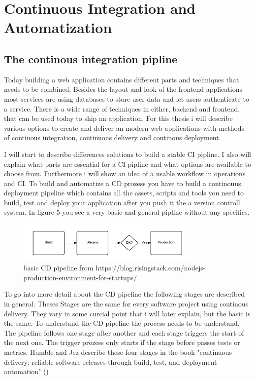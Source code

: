 \newpage

\section{Continuous Integration and Automatization}
\label{section:The Foundations of Continuous Integration and Automatization in Development Operations}

\subsection{The continous integration pipline}
Today building a web application contains different parts and techniques that needs to be combined. Besides the layout and look of the frontend applications
most services are using databases to store user data and let users authenticate to a service. There is a wide range of techniques in either, backend and
frontend, that can be used today to ship an application. For this thesis i will describe various options to create and deliver an modern web
applications with methods of continous integration, continuous delivery and continous deployment.

I will start to describe differences solutions to build a stable CI pipline. I also will explain what parts are essential for a CI pipline and what options
are available to choose from. Furthermore i will show an idea of a usable workflow in operations and CI. To build and automatize a CD prozess you have to build
a continouus deployment pipeline which contains all the assets, scripts and tools you need to build, test and deploy your application after you push it the a
version controll system. In figure 5 you see a very basic and general pipline without any specifics.


\begin{figure}[h!]
  \centering
  \includegraphics[width=0.8\textwidth]{images/pipeline.png}
  \caption{basic CD pipeline from https://blog.risingstack.com/nodejs-production-environment-for-startups/}
\end{figure}

To go into more detail about the CD pipeline the following stages are described in general. Theses Stages are the same for every software project using
continous delivery. They vary in some curcial point that i will later explain, but the basic is the same. To understand the CD pipeline the process needs
to be understand. The pipeline follows one stage after another and each stage triggers the start of the next one. The trigger prozess only starts if the
stage before passes tests or metrics. Humble and Jez describe these four stages in the book "continuous delivery: reliable software releases through build,
test, and deployment automation" (\cite{humble2010continuous})

